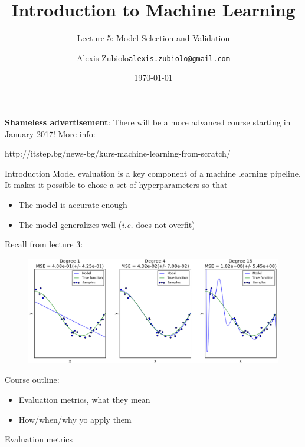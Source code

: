 \documentclass{beamer}
\title[Classification]{Introduction to Machine Learning}
\subtitle{Lecture 5: Model Selection and Validation}
\author{Alexis Zubiolo\newline\texttt{alexis.zubiolo@gmail.com}}
\institute{Data Science Team Lead @ Adcash}
\date{\today}
\begin{document}
\begin{frame}
  \titlepage
\end{frame}

\begin{frame}
\textbf{Shameless advertisement}: There will be a more advanced course starting in January 2017!
\vfill
More info:
\begin{center}
http://itstep.bg/news-bg/kurs-machine-learning-from-scratch/
\end{center}
\end{frame}

\begin{frame}{Introduction}
Model evaluation is a key component of a machine learning pipeline.
\pause
\vfill
It makes it possible to chose a set of hyperparameters so that
\begin{itemize}
	\item The model is accurate enough
	\item The model generalizes well (\textit{i.e.} does not overfit)
\end{itemize}
\vfill
\pause
Recall from lecture 3:
\begin{figure}
\centering
\includegraphics[width=\textwidth]{images/over_under_fitting.png}
\end{figure}
\end{frame}

\begin{frame}
Course outline:
\begin{itemize}
	\item Evaluation metrics, what they mean
	\item How/when/why yo apply them
\end{itemize}
\end{frame}

\begin{frame}
\begin{center}
\Huge{Evaluation metrics}
\end{center}
\end{frame}
\end{document}
